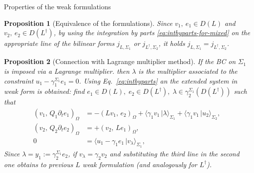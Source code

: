 \documentclass[aspectratio=169]{beamer}
\newcommand{\inner}[3][]{\ensuremath{( #2, \, #3 )_{#1}}}
\newcommand{\dualpr}[3][]{\ensuremath{\langle #2 \, \vert #3 \rangle_{#1}}}
\newtheorem{proposition}{Proposition}
\begin{document}
\begin{frame}{Properties of the weak formulations}
	\begin{proposition}[Equivalence of the formulations]\label{pr:equivalence}
		Since $v_1,\ e_1 \in D(L)$ and $v_2,\ e_2 \in D(L^\dag)$, by using the integration by parts \eqref{eq:intbyparts-for-mixed}  on the appropriate line of the bilinear forms $j_{L,\Sigma_1}$ or $j_{L^\dag,\Sigma_2}$, it holds $j_{L,\Sigma_1} = j_{L^\dag,\Sigma_2}$. 
	\end{proposition}

\begin{proposition}[Connection with Lagrange multiplier method]
If the BC on $\Sigma_1$ is imposed via a Lagrange multiplier. then $\lambda$ is the multiplier associated to  the constraint $u_1 - \gamma_1^{\Sigma_1} e_1 = 0$. Using 
Eq.~\eqref{eq:intbyparts} an the extended system in weak form is obtained: find $e_1 \in D(L), \; e_2 \in D(L^\dag), \; \lambda \in \gamma_2^{\Sigma_1}\left(D(L^\dag)\right)$ such that
\begin{equation*}
	\begin{aligned}
		\inner[\Omega]{v_1}{Q_1 \partial_t e_1} &= -\inner[\Omega]{L v_1}{e_2}
		+\dualpr[\Sigma_1]{\gamma_1 v_1}{\lambda}
		+\dualpr[\Sigma_2]{\gamma_1 v_1}{u_2}, \\
		\inner[\Omega]{v_2}{Q_2 \partial_t e_2} &= +\inner[\Omega]{v_2}{L e_1}, \\
		0 &= \dualpr[\Sigma_1]{u_1 - \gamma_1 e_1}{v_\lambda},
	\end{aligned}
\end{equation*}
Since $\lambda = y_1 := \gamma_2^{\Sigma_1} e_2$, if $v_\lambda = \gamma_2 v_2$ and substituting the third line in the second one obtains to previous $L$ weak formulation (and analogously for $L^\dag$).

\end{proposition}

\end{frame}
\end{document}
